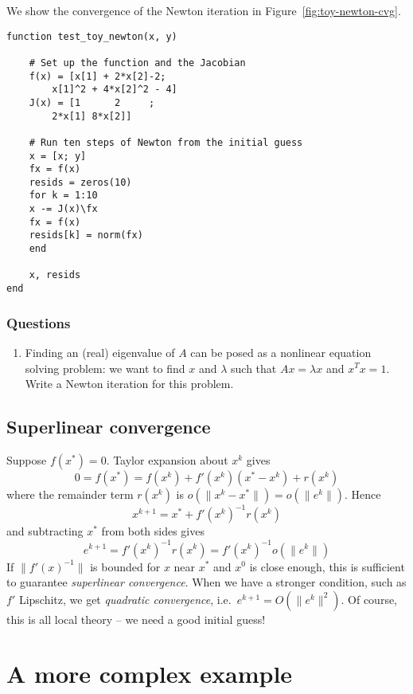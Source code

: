 \documentclass[12pt, leqno]{article} %
\providecommand{\tightlist}{%
  \setlength{\itemsep}{0pt}\setlength{\parskip}{0pt}}
\begin{document}
We show the convergence of the Newton iteration in Figure~\ref{fig:toy-newton-cvg}.

\begin{verbatim}
function test_toy_newton(x, y)

    # Set up the function and the Jacobian
    f(x) = [x[1] + 2*x[2]-2; 
	    x[1]^2 + 4*x[2]^2 - 4]
    J(x) = [1      2     ;
	    2*x[1] 8*x[2]]
    
    # Run ten steps of Newton from the initial guess
    x = [x; y]
    fx = f(x)
    resids = zeros(10)
    for k = 1:10
	x -= J(x)\fx
	fx = f(x)
	resids[k] = norm(fx)
    end

    x, resids
end
\end{verbatim}

\subsubsection{Questions}

\begin{enumerate}
\def\labelenumi{\arabic{enumi}.}
\tightlist
\item
  Finding an (real) eigenvalue of \(A\) can be posed as a nonlinear
  equation solving problem: we want to find \(x\) and \(\lambda\) such
  that \(Ax = \lambda x\) and \(x^T x = 1\). Write a Newton iteration
  for this problem.
\end{enumerate}

\subsection{Superlinear convergence}

Suppose \(f(x^*) = 0\). Taylor expansion about \(x^k\) gives
\[0 = f(x^*) = f(x^k) + f'(x^k) (x^*-x^k) + r(x^k)\] where the remainder
term \(r(x^k)\) is \(o(\|x^k-x^*\|) = o(\|e^k\|)\). Hence
\[x^{k+1} = x^* + f'(x^{k})^{-1} r(x^k)\] and subtracting \(x^*\) from
both sides gives
\[e^{k+1} = f'(x^k)^{-1} r(x^k) = f'(x^k)^{-1} o(\|e^k\|)\] If
\(\|f'(x)^{-1}\|\) is bounded for \(x\) near \(x^*\) and \(x^0\) is
close enough, this is sufficient to guarantee \emph{superlinear
convergence}. When we have a stronger condition, such as \(f'\)
Lipschitz, we get \emph{quadratic convergence},
i.e.~\(e^{k+1} = O(\|e^k\|^2)\). Of course, this is all local theory --
we need a good initial guess!

\section{A more complex example}
\end{document}

